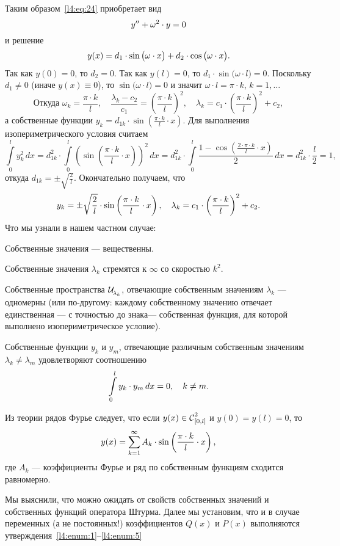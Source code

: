 Таким образом~\eqref{l4:eq:24} приобретает вид
\begin{equation*}
	\hfill y''+\omega^2\cdot y=0\hfill
\end{equation*}  
и решение
\begin{equation*}
	\hfill y(x)=d_1\cdot\sin\big(\omega\cdot x\big)+d_2\cdot\cos\big(\omega\cdot x\big).\hfill
\end{equation*}
Так как $y(0)=0$, то $d_2=0$. Так как $y(l)=0$, то $d_1\cdot\sin\big(\omega\cdot l\big)=0$. Поскольку $d_1\neq0$ (иначе $y(x)\equiv0$), то $\sin\big(\omega\cdot l\big)=0$ и значит $\omega\cdot l=\pi\cdot k$, $k=1,\ldots$ 
\begin{equation*}
	\text{Откуда }\omega_k=\frac{\pi\cdot k}{l},\quad \frac{\lambda_k-c_2}{c_1}=\left(\frac{\pi\cdot k}{l}\right)^2,\quad\lambda_k=c_1\cdot\left(\frac{\pi\cdot k}{l}\right)^2+c_2,
\end{equation*}
а собственные функции $y_k=d_{1k}\cdot\sin\left(\frac{\pi\cdot k}{l}\cdot x\right)$. Для выполнения изопериметрического условия считаем
\begin{equation*}
	\int\limits_0^l y_k^2\,dx=d_{1k}^2\cdot\int\limits_0^l\left(\sin\left(\frac{\pi\cdot k}{l}\cdot x\right)\right)^2\,dx=d_{1k}^2\cdot\int\limits_0^l\frac{1-\cos\left(\frac{2\cdot\pi\cdot k}{l}\cdot x\right)}{2}\,dx=d_{1k}^2\cdot\frac{l}{2}=1,
\end{equation*}
откуда $d_{1k}=\pm\displaystyle\sqrt{\frac{2}{l}}$. Окончательно получаем, что
\begin{equation*}
	\hfill y_k=\pm\sqrt{\frac{2}{l}}\cdot\sin\left(\frac{\pi\cdot k}{l}\cdot x\right),\quad\lambda_k=c_1\cdot\left(\frac{\pi\cdot k}{l}\right)^2+c_2.\hfill
\end{equation*}
Что мы узнали в нашем частном случае:
\begin{enumerateD}
	\item\label{l4:enum:1} Собственные значения --- вещественны.
	\item Собственные значения $\lambda_k$ стремятся к $\infty$ со скоростью $k^2$.
	\item Собственные пространства $\displaystyle \Ul[\lambda_k]$, отвечающие собственным значениям $\lambda_k$ --- одномерны (или по-другому: каждому собственному значению отвечает единственная --- с точностью до знака--- собственная функция, для которой выполнено изопериметрическое условие).
	\item Собственные функции $y_k$ и $y_m$, отвечающие различным собственным значениям $\lambda_k\neq\lambda_m$ удовлетворяют соотношению
	\begin{equation*}
		\hfill\int\limits_0^l y_k\cdot y_m\,dx=0,\quad k\neq m.\hfill
	\end{equation*}
	\item\label{l4:enum:5} Из теории рядов Фурье следует, что если $y(x)\in\Cfn[{[0,l]}]{2}$ и $y(0)=y(l)=0$, то 
	\begin{equation*}
		\hfill y(x)=\sum\limits_{k=1}^{\infty} A_k\cdot\sin\left(\frac{\pi\cdot k}{l}\cdot x\right),\hfill
	\end{equation*}
	где $A_k$ --- коэффициенты Фурье и ряд по собственным функциям сходится равномерно. 
\end{enumerateD}

Мы выяснили, что можно ожидать от свойств собственных значений и собственных функций оператора Штурма. Далее мы установим, что и в случае переменных (а не постоянных!) коэффициентов $Q(x)$ и $P(x)$ выполняются утверждения~\ref{l4:enum:1}--\ref{l4:enum:5}
